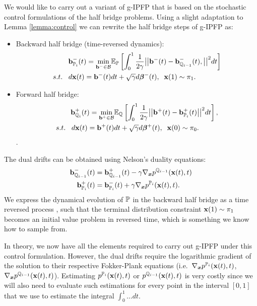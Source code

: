 \documentclass[a4paper,12pt,twoside,openright]{report}
\theoremstyle{definition}
\begin{document}
We would like to carry out a variant of g-IPFP that is based on the stochastic control formulations of the half bridge problems. Using a slight adaptation to Lemma \ref{lemma:control} we can rewrite the half bridge steps of g-IPFP as:
\begin{itemize}
\item Backward half bridge (time-reversed dynamics): 
\begin{align} \label{eq:controlled_haalf_bridge_forward}
  \rvb^{-}_{\P_{i}}(t) = \min_{\rvb^{-} \in \calB }  &\E_\P\left[\int_0^1 \frac{1}{2\gamma}\big|\big|\rvb^{-}(t) -\rvb^{-}_{\Q_{i-1}}(t), \big|\big|^2 dt\right] \nonumber \\
    s.t.\;\;\; d\rvx(t) = \rvb^{-}(t) &dt + \sqrt{\gamma} d\rvw^{-}(t), \;\; \rvx(1) \sim \pi_1.
\end{align}
\item Forward half bridge:
\begin{align} \label{eq:controlled_half_bridge_backward}
   \rvb^{+}_{\Q_{i}}(t) =\min_{\rvb^{+} \in \calB } & \E_\Q\left[\int_0^1 \frac{1}{2\gamma}\big|\big|\rvb^{+}(t) -\rvb^{+}_{\P_{i}}(t)\big|\big|^2 dt\right], \nonumber \\
    s.t.\;\;\; d\rvx(t) = \rvb^{+}(t) &dt + \sqrt{\gamma} d\rvw^{+}(t), \;\; \rvx(0) \sim \pi_0.
\end{align}.
\end{itemize}
The dual drifts can be obtained using Nelson's duality equations:
\begin{align*}
      \rvb^{-}_{\Q_{i-1}}(t)   &=\rvb^{+}_{\Q_{i-1}}(t) -\gamma\nabla_{\vx} p^{\Q_{i-1}}(\rvx(t), t) \\
    \rvb^{+}_{\P_{i}}(t) &=  \rvb^{-}_{\P_{i}}(t) +\gamma\nabla_{\vx} p^{\P_{i}}(\rvx(t), t).
\end{align*}
We express the dynamical evolution of $\P$ in the backward half bridge as a time reversed process \citep{pavon1991free, nelson1967dynamical}, such that the terminal distribution constraint $\rvx(1) \sim \pi_1$ becomes an initial value problem in reversed time, which is something we know how to sample from. 

In theory, we now have all the elements required to carry out g-IPFP under this control formulation. However, the dual drifts require the logarithmic gradient of the solution to their respective Fokker-Plank equations (i.e.\ $\nabla_{\vx} p^{\P_{i}}(\rvx(t), t)$, $\nabla_{\vx} p^{\Q_{i-1}}(\rvx(t), t)$). Estimating $p^{\P_{i}}(\rvx(t), t)$ or $p^{\Q_{i-1}}(\rvx(t), t)$ is very costly since we will also need to evaluate such estimations for every point in the interval $[0,1]$ that we use to estimate the integral $\int_0^1 \hdots dt$.
\end{document}
